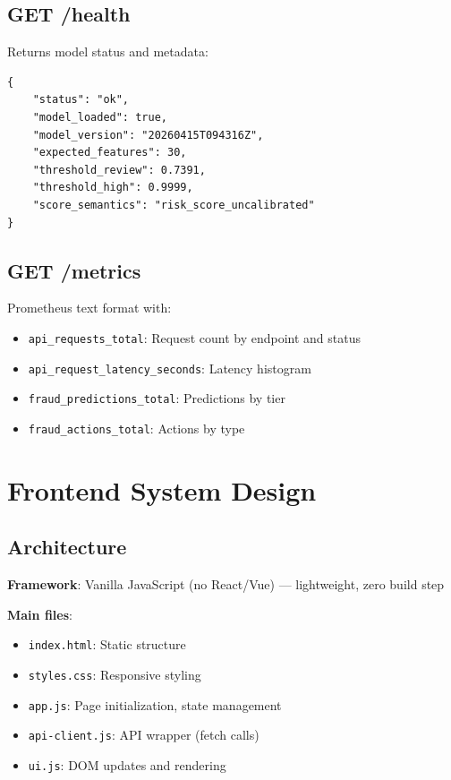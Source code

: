\documentclass[12pt,a4paper]{article}
\newcommand{\code}[1]{\texttt{#1}}
\begin{document}
\subsection{GET /health}

Returns model status and metadata:

\begin{lstlisting}
{
    "status": "ok",
    "model_loaded": true,
    "model_version": "20260415T094316Z",
    "expected_features": 30,
    "threshold_review": 0.7391,
    "threshold_high": 0.9999,
    "score_semantics": "risk_score_uncalibrated"
}
\end{lstlisting}

\subsection{GET /metrics}

Prometheus text format with:
\begin{itemize}
    \item \code{api\_requests\_total}: Request count by endpoint and status
    \item \code{api\_request\_latency\_seconds}: Latency histogram
    \item \code{fraud\_predictions\_total}: Predictions by tier
    \item \code{fraud\_actions\_total}: Actions by type
\end{itemize}

\section{Frontend System Design}

\subsection{Architecture}

\textbf{Framework}: Vanilla JavaScript (no React/Vue) — lightweight, zero build step

\textbf{Main files}:
\begin{itemize}
    \item \code{index.html}: Static structure
    \item \code{styles.css}: Responsive styling
    \item \code{app.js}: Page initialization, state management
    \item \code{api-client.js}: API wrapper (fetch calls)
    \item \code{ui.js}: DOM updates and rendering
\end{itemize}
\end{document}

